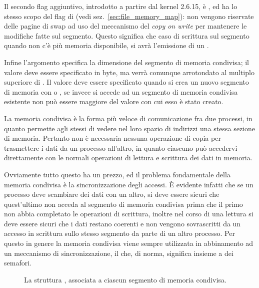 Il secondo flag aggiuntivo, introdotto a partire dal kernel 2.6.15, è
, ed ha lo stesso scopo del flag 
di  (vedi sez.~\ref{sec:file_memory_map}): non vengono riservate
delle pagine di swap ad uso del meccanismo del \textit{copy on write} per
mantenere le modifiche fatte sul segmento. Questo significa che caso di
scrittura sul segmento quando non c'è più memoria disponibile, si avrà
l'emissione di un .

Infine l'argomento  specifica la dimensione del segmento di
memoria condivisa; il valore deve essere specificato in byte, ma verrà
comunque arrotondato al multiplo superiore di . Il valore
deve essere specificato quando si crea un nuovo segmento di memoria con
 o , se invece si accede ad un segmento
di memoria condivisa esistente non può essere maggiore del valore con cui esso
è stato creato.

La memoria condivisa è la forma più veloce di comunicazione fra due processi,
in quanto permette agli stessi di vedere nel loro spazio di indirizzi una
stessa sezione di memoria.  Pertanto non è necessaria nessuna operazione di
copia per trasmettere i dati da un processo all'altro, in quanto ciascuno può
accedervi direttamente con le normali operazioni di lettura e scrittura dei
dati in memoria.

Ovviamente tutto questo ha un prezzo, ed il problema fondamentale della
memoria condivisa è la sincronizzazione degli accessi. È evidente infatti che
se un processo deve scambiare dei dati con un altro, si deve essere sicuri che
quest'ultimo non acceda al segmento di memoria condivisa prima che il primo
non abbia completato le operazioni di scrittura, inoltre nel corso di una
lettura si deve essere sicuri che i dati restano coerenti e non vengono
sovrascritti da un accesso in scrittura sullo stesso segmento da parte di un
altro processo. Per questo in genere la memoria condivisa viene sempre
utilizzata in abbinamento ad un meccanismo di sincronizzazione, il che, di
norma, significa insieme a dei semafori.

\begin{figure}[!htb]
  \footnotesize \centering
  \begin{minipage}[c]{0.80\textwidth}
  \end{minipage} 
  \normalsize 
  \caption{La struttura , associata a ciascun segmento di
    memoria condivisa.}
  \label{fig:ipc_shmid_ds}
\end{figure}

